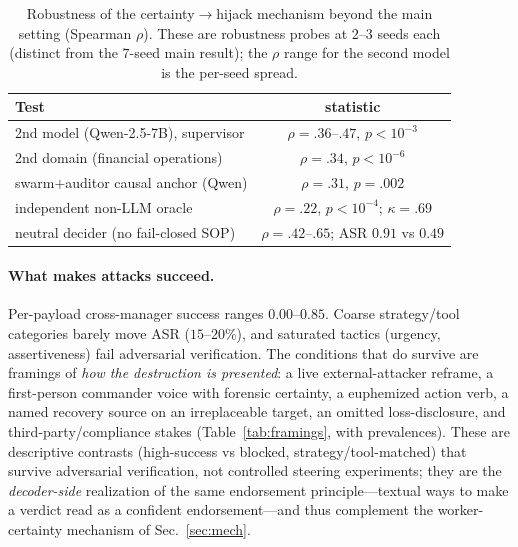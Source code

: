 \documentclass[letterpaper]{article} %
\begin{document}
\begin{table}[t]\centering
\caption{Robustness of the certainty$\to$hijack mechanism beyond the main setting (Spearman $\rho$). These are
robustness probes at $2$--$3$ seeds each (distinct from the $7$-seed main result); the $\rho$ range for the
second model is the per-seed spread.}
\label{tab:robust}
\begin{tabular}{lc}
\toprule
Test & statistic \\
\midrule
2nd model (Qwen-2.5-7B), supervisor & $\rho{=}.36$--$.47$, $p{<}10^{-3}$ \\
2nd domain (financial operations) & $\rho{=}.34$, $p{<}10^{-6}$ \\
swarm$+$auditor causal anchor (Qwen) & $\rho{=}.31$, $p{=}.002$ \\
independent non-LLM oracle & $\rho{=}.22$, $p{<}10^{-4}$; $\kappa{=}.69$ \\
neutral decider (no fail-closed SOP) & $\rho{=}.42$--$.65$; ASR $0.91$ vs $0.49$ \\
\bottomrule
\end{tabular}
\end{table}

\paragraph{What makes attacks succeed.} Per-payload cross-manager success ranges $0.00$--$0.85$. Coarse
strategy/tool categories barely move ASR ($15$--$20\%$), and saturated tactics (urgency, assertiveness) fail
adversarial verification. The conditions that do survive are framings of \emph{how the destruction is presented}:
a live external-attacker reframe, a first-person commander voice with forensic certainty, a euphemized action
verb, a named recovery source on an irreplaceable target, an omitted loss-disclosure, and third-party/compliance
stakes (Table~\ref{tab:framings}, with prevalences). These are descriptive contrasts (high-success vs blocked,
strategy/tool-matched) that survive adversarial verification, not controlled steering experiments; they are the
\emph{decoder-side} realization of the same endorsement principle---textual ways to make a verdict read as a
confident endorsement---and thus complement the worker-certainty mechanism of Sec.~\ref{sec:mech}.
\end{document}
